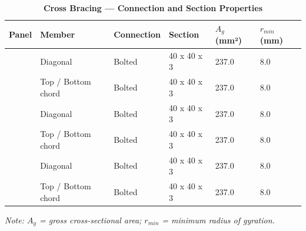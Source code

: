 \documentclass[12pt,a4paper]{report}
\numberwithin{table}{chapter}
\numberwithin{figure}{chapter}
\begin{document}
\vspace{1em}

\vspace{0.4em}
\noindent
\setlength{\tabcolsep}{4pt}
\setlength\LTleft{0pt}
\setlength\LTright{\fill}

\begin{longtable}{|C{2.0cm}|L{2.0cm}|L{2.2cm}|C{2.5cm}|C{2.0cm}|C{2.0cm}|}
\caption{\textbf{Cross Bracing --- Connection and Section Properties}}\\
\hline
\textbf{Panel} & \textbf{Member} & \textbf{Connection} & \textbf{Section} & \textbf{$A_g$ (mm²)} & \textbf{$r_{min}$ (mm)} \\[6pt]
\hline
{} & Diagonal & Bolted & 40 x 40 x 3 & 237.0 & 8.0 \\[6pt]
 & Top / Bottom chord & Bolted & 40 x 40 x 3 & 237.0 & 8.0 \\[6pt]
\hline
{} & Diagonal & Bolted & 40 x 40 x 3 & 237.0 & 8.0 \\[6pt]
 & Top / Bottom chord & Bolted & 40 x 40 x 3 & 237.0 & 8.0 \\[6pt]
\hline
{} & Diagonal & Bolted & 40 x 40 x 3 & 237.0 & 8.0 \\[6pt]
 & Top / Bottom chord & Bolted & 40 x 40 x 3 & 237.0 & 8.0 \\[6pt]
\hline
\end{longtable}
\noindent\textit{Note: $A_g$ = gross cross-sectional area; $r_{min}$ = minimum radius of gyration.}
\end{document}

